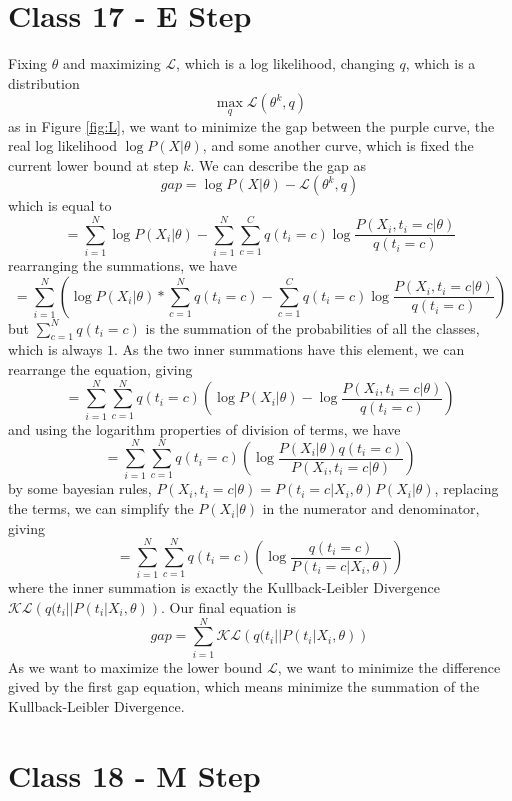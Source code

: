 \documentclass{article}
\begin{document}
\section{Class 17 - E Step}
Fixing $\theta$ and maximizing $\mathcal{L}$, which is a log likelihood, changing $q$, which is a distribution
\begin{equation}
    \max_q \mathcal{L}(\theta^k, q)
\end{equation}
as in Figure \ref{fig:L}, we want to minimize the gap between the purple curve, the real log likelihood $\log P(X|\theta)$, and some another curve, which is fixed the current lower bound at step $k$. We can describe the gap as
\begin{equation}
    gap = \log P(X|\theta) - \mathcal{L}(\theta^k, q)
\end{equation}
which is equal to
\begin{equation}
    = \sum_{i=1}^N \log P(X_i|\theta) - \sum_{i=1}^N \sum_{c=1}^C q(t_i = c) \log \frac{P(X_i, t_i = c|\theta)}{q(t_i = c)}
\end{equation}
rearranging the summations, we have
\begin{equation}
    = \sum_{i=1}^N \left( \log P(X_i|\theta) * \sum_{c=1}^N q(t_i = c) - \sum_{c=1}^C q(t_i = c) \log \frac{P(X_i, t_i = c|\theta)}{q(t_i = c)} \right)
\end{equation}
but $\sum_{c=1}^N q(t_i = c)$ is the summation of the probabilities of all the classes, which is always $1$. As the two inner summations have this element, we can rearrange the equation, giving
\begin{equation}
    = \sum_{i=1}^N \sum_{c=1}^N q(t_i = c) \left( \log P(X_i|\theta) - \log \frac{P(X_i, t_i = c|\theta)}{q(t_i = c)} \right)
\end{equation}
and using the logarithm properties of division of terms, we have
\begin{equation}
    = \sum_{i=1}^N \sum_{c=1}^N q(t_i = c) \left( \log \frac{P(X_i|\theta) q(t_i = c)}{P(X_i, t_i = c|\theta)} \right)
\end{equation}
by some bayesian rules, $P(X_i, t_i = c|\theta) = P(t_i = c|X_i, \theta)P(X_i|\theta)$, replacing the terms, we can simplify the $P(X_i|\theta)$ in the numerator and denominator, giving 
\begin{equation}
    = \sum_{i=1}^N \sum_{c=1}^N q(t_i = c) \left( \log \frac{q(t_i = c)}{P(t_i = c|X_i, \theta)} \right)
\end{equation}
where the inner summation is exactly the Kullback-Leibler Divergence $\mathcal{KL}\left(q(t_i||P(t_i|X_i, \theta)\right)$. Our final equation is
\begin{equation}
    gap = \sum_{i=1}^N \mathcal{KL}\left(q(t_i||P(t_i|X_i, \theta)\right)
\end{equation}
As we want to maximize the lower bound $\mathcal{L}$, we want to minimize the difference gived by the first gap equation, which means minimize the summation of the Kullback-Leibler Divergence.

\section{Class 18 - M Step}
\end{document}
